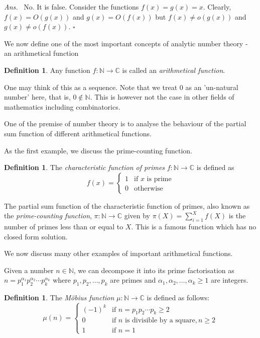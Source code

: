 \documentclass[10pt,openany]{book}
\theoremstyle{italicnonumber}
\theoremstyle{definition}
\newtheorem{definition}[theorem]{Definition}
\newenvironment{answer}{\par\noindent\emph{Ans.}\ }{\hfill$\square$\par\vspace{1ex}}
\newcommand{\N}{\mathbb{N}}
\newcommand{\bC}{\mathbb{C}}
\begin{document}
\begin{answer}
  No. It is false. Consider the functions $f(x)=g(x)=x$. Clearly, $f(x) = O(g(x))$ and $g(x) = O(f(x))$ but $f(x) \neq o(g(x))$ and $g(x) \neq o(f(x))$.
\end{answer}

We now define one of the most important concepts of analytic number theory - an arithmetical function

\begin{definition}
  Any function $f: \N \to \mathbb{C}$ is called an \textit{arithmetical function}. 
\end{definition}

One may think of this as a sequence. Note that we treat $0$ as an 'un-natural number' here, that is, $0 \notin \N$. This is however not the case in other fields of mathematics including combinatorics.

One of the premise of number theory is to analyse the behaviour of the partial sum function of different arithmetical functions.

As the first example, we discuss the prime-counting function.

\begin{definition}
  The \textit{characteristic function of primes} $f:\N \to \bC$ is defined as
  \[
  f(x) = \begin{cases}
    1 & \text{if } x \text{ is prime} \\
    0 & \text{otherwise}
  \end{cases}
  \]
\end{definition}

The partial sum function of the characteristic function of primes, also known as the \textit{prime-counting function}, $\pi:\N \to \bC$ given by $\pi(X) = \sum_{i=1}^X f(X)$ is the number of primes less than or equal to $X$. This is a famous function which has no closed form solution.

We now discuss many other examples of important arithmetical functions.

Given a number $n\in \N$, we can decompose it into its prime factorisation as $n=p_1^{\alpha_1} p_2^{\alpha_2} \cdots p_k^{\alpha_k}$ where $p_1,p_2,\dots,p_k$ are primes and $\alpha_1,\alpha_2,\dots,\alpha_k \geq 1$ are integers.

\begin{definition}
  The \textit{Möbius function} $\mu:\N \to \bC$ is defined as follows:
  \[
  \mu(n) = \begin{cases}
    (-1)^k & \text{if } n=p_1 p_2 \cdots p_k \geq 2 \\
    0 & \text{if } n \text{ is divisible by a square}, n \geq 2 \\
    1 & \text{if } n=1
  \end{cases}
  \]
\end{definition}
\end{document}
